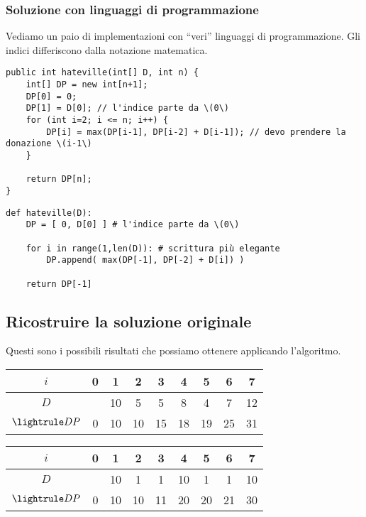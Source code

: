 \subsubsection{Soluzione con linguaggi di programmazione}

Vediamo un paio di implementazioni con \enquote{veri} linguaggi di programmazione.
Gli indici differiscono dalla notazione matematica.

\begin{code}
\begin{verbatim}
public int hateville(int[] D, int n) {
    int[] DP = new int[n+1];
    DP[0] = 0;
    DP[1] = D[0]; // l'indice parte da \(0\)
    for (int i=2; i <= n; i++) {
        DP[i] = max(DP[i-1], DP[i-2] + D[i-1]); // devo prendere la donazione \(i-1\)
    }

    return DP[n];
}
\end{verbatim}
\end{code}

\begin{code}
\begin{verbatim}
def hateville(D):
    DP = [ 0, D[0] ] # l'indice parte da \(0\)

    for i in range(1,len(D)): # scrittura più elegante
        DP.append( max(DP[-1], DP[-2] + D[i]) )

    return DP[-1]
\end{verbatim}
\end{code}

\subsection{Ricostruire la soluzione originale}

Questi sono i possibili risultati che possiamo ottenere applicando l'algoritmo.

\vspace{1ex}
\begin{minipage}{.5\linewidth}\centering
    \begin{tabular}{@{} >{$}c<{$} *{8}{c} @{}}
    \toprule
    i & 0 & 1 & 2 & 3 & 4 & 5 & 6 & 7\\
    \midrule
    D &  & 10 & 5 & 5 & 8 & 4 & 7 & 12\\
    \lightrule
    DP & 0 & 10 & 10 & 15 & 18 & 19 & 25 & 31\\
    \bottomrule
    \end{tabular}
\end{minipage}%
\begin{minipage}{.5\linewidth}\centering
    \begin{tabular}{@{} >{$}c<{$} *{8}{c} @{}}
    \toprule
    i & 0 & 1 & 2 & 3 & 4 & 5 & 6 & 7\\
    \midrule
    D &  & 10 & 1 & 1 & 10 & 1 & 1 & 10\\
    \lightrule
    DP & 0 & 10 & 10 & 11 & 20 & 20 & 21 & 30\\
    \bottomrule
    \end{tabular}
\end{minipage}
\vspace{1ex}

